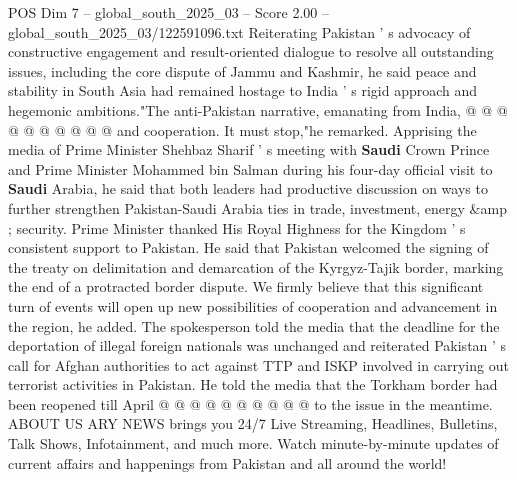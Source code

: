 \begin{textsample}{POS Dim 7 – global\_south\_2025\_03 – Score 2.00 – global\_south\_2025\_03/122591096.txt}
Reiterating Pakistan ' s advocacy of constructive engagement and result-oriented dialogue to resolve all outstanding issues, including the core dispute of Jammu and Kashmir, he said peace and stability in South Asia had remained hostage to India ' s rigid approach and hegemonic ambitions."The anti-Pakistan narrative, emanating from India, @ @ @ @ @ @ @ @ @ @ and cooperation.
It must stop,"he remarked.
Apprising the media of Prime Minister Shehbaz Sharif ' s meeting with \textbf{Saudi} Crown Prince and Prime Minister Mohammed bin Salman during his four-day official visit to \textbf{Saudi} Arabia, he said that both leaders had productive discussion on ways to further strengthen Pakistan-Saudi Arabia ties in trade, investment, energy \&amp ; security.
Prime Minister thanked His Royal Highness for the Kingdom ' s consistent support to Pakistan.
He said that Pakistan welcomed the signing of the treaty on delimitation and demarcation of the Kyrgyz-Tajik border, marking the end of a protracted border dispute.
We firmly believe that this significant turn of events will open up new possibilities of cooperation and advancement in the region, he added.
The spokesperson told the media that the deadline for the deportation of illegal foreign nationals was unchanged and reiterated Pakistan ' s call for Afghan authorities to act against TTP and ISKP involved in carrying out terrorist activities in Pakistan.
He told the media that the Torkham border had been reopened till April @ @ @ @ @ @ @ @ @ @ to the issue in the meantime.
ABOUT US ARY NEWS brings you 24/7 Live Streaming, Headlines, Bulletins, Talk Shows, Infotainment, and much more.
Watch minute-by-minute updates of current affairs and happenings from Pakistan and all around the world!

\end{textsample}
